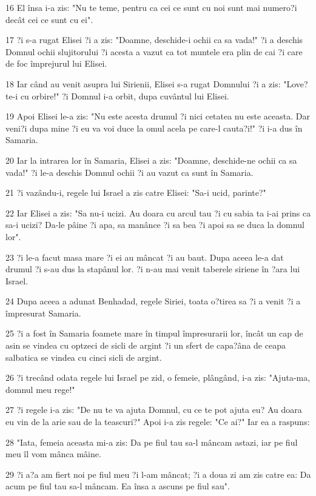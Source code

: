 \par 16 El însa i-a zis: "Nu te teme, pentru ca cei ce sunt cu noi sunt mai numero?i decât cei ce sunt cu ei".
\par 17 ?i s-a rugat Elisei ?i a zis: "Doamne, deschide-i ochii ca sa vada!" ?i a deschis Domnul ochii slujitorului ?i acesta a vazut ca tot muntele era plin de cai ?i care de foc împrejurul lui Elisei.
\par 18 Iar când au venit asupra lui Sirienii, Elisei s-a rugat Domnului ?i a zis: "Love?te-i cu orbire!" ?i Domnul i-a orbit, dupa cuvântul lui Elisei.
\par 19 Apoi Elisei le-a zis: "Nu este acesta drumul ?i nici cetatea nu este aceasta. Dar veni?i dupa mine ?i eu va voi duce la omul acela pe care-l cauta?i!" ?i i-a dus în Samaria.
\par 20 Iar la intrarea lor în Samaria, Elisei a zis: "Doamne, deschide-ne ochii ca sa vada!" ?i le-a deschis Domnul ochii ?i au vazut ca sunt în Samaria.
\par 21 ?i vazându-i, regele lui Israel a zis catre Elisei: "Sa-i ucid, parinte?"
\par 22 Iar Elisei a zis: "Sa nu-i ucizi. Au doara cu arcul tau ?i cu sabia ta i-ai prins ca sa-i ucizi? Da-le pâine ?i apa, sa manânce ?i sa bea ?i apoi sa se duca la domnul lor".
\par 23 ?i le-a facut masa mare ?i ei au mâncat ?i au baut. Dupa aceea le-a dat drumul ?i s-au dus la stapânul lor. ?i n-au mai venit taberele siriene în ?ara lui Israel.
\par 24 Dupa aceea a adunat Benhadad, regele Siriei, toata o?tirea sa ?i a venit ?i a împresurat Samaria.
\par 25 ?i a fost în Samaria foamete mare în timpul împresurarii lor, încât un cap de asin se vindea cu optzeci de sicli de argint ?i un sfert de capa?âna de ceapa salbatica se vindea cu cinci sicli de argint.
\par 26 ?i trecând odata regele lui Israel pe zid, o femeie, plângând, i-a zis: "Ajuta-ma, domnul meu rege!"
\par 27 ?i regele i-a zis: "De nu te va ajuta Domnul, cu ce te pot ajuta eu? Au doara eu vin de la arie sau de la teascuri?" Apoi i-a zis regele: "Ce ai?" Iar ea a raspuns:
\par 28 "Iata, femeia aceasta mi-a zis: Da pe fiul tau sa-l mâncam astazi, iar pe fiul meu îl vom mânca mâine.
\par 29 ?i a?a am fiert noi pe fiul meu ?i l-am mâncat; ?i a doua zi am zis catre ea: Da acum pe fiul tau sa-l mâncam. Ea însa a ascuns pe fiul sau".
